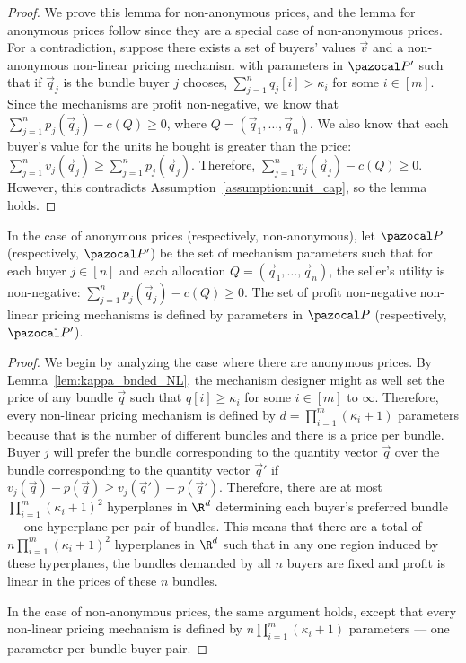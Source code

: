 \begin{proof}
We prove this lemma for non-anonymous prices, and the lemma for anonymous prices follow since they are a special case of non-anonymous prices. For a contradiction, suppose there exists a set of buyers' values $\vec{v}$ and a non-anonymous non-linear pricing mechanism with parameters in $\pspace'$ such that if $\vec{q}_j$ is the bundle buyer $j$ chooses, $\sum_{j = 1}^n q_j[i] > \kappa_i$ for some $i \in [m]$. Since the mechanisms are profit non-negative, we know that $\sum_{j = 1}^n p_j(\vec{q}_j)- c\left(Q\right) \geq 0$, where $Q = \left(\vec{q}_1, \dots, \vec{q}_n\right)$. We also know that each buyer's value for the units he bought is greater than the price: $\sum_{j = 1}^n v_j(\vec{q}_j) \geq \sum_{j = 1}^n p_j(\vec{q}_j)$. Therefore, $\sum_{j = 1}^n v_j(\vec{q}_j) - c(Q) \geq 0$. However, this contradicts Assumption~\ref{assumption:unit_cap}, so the lemma holds.
\end{proof}

\begin{definition}\label{def:PNN_NL}
	In the case of anonymous prices (respectively, non-anonymous), let $\pspace$ (respectively, $\pspace'$) be the set of mechanism parameters such that for each buyer $j \in [n]$ and each allocation $Q = \left(\vec{q}_1, \dots, \vec{q}_n\right)$, the seller's utility is non-negative: $\sum_{j = 1}^n p_j(\vec{q}_j) - c\left(Q\right) \geq 0.$ The set of profit non-negative non-linear pricing mechanisms is defined by parameters in $\pspace$ (respectively, $\pspace'$).
\end{definition}

\nonlinear*

\begin{proof}
We begin by analyzing the case where there are anonymous prices. By Lemma~\ref{lem:kappa_bnded_NL}, the mechanism designer might as well set the price of any bundle $\vec{q}$ such that $q[i] \geq \kappa_i$ for some $i \in [m]$ to $\infty$. Therefore, every non-linear pricing mechanism is defined by $d = \prod_{i = 1}^m \left(\kappa_i+1\right)$ parameters because that is the number of different bundles and there is a price per bundle. Buyer $j$ will prefer the bundle corresponding to the quantity vector $\vec{q}$ over the bundle corresponding to the quantity vector $\vec{q}'$ if $v_j(\vec{q}) - p(\vec{q}) \geq v_j(\vec{q}') - p(\vec{q}')$. Therefore, there are at most $\prod_{i = 1}^m \left(\kappa_i+1\right)^2$ hyperplanes in $\R^{d}$ determining each buyer's preferred bundle --- one hyperplane per pair of bundles. This means that there are a total of $n\prod_{i = 1}^m \left(\kappa_i+1\right)^2$ hyperplanes in $\R^{d}$ such that in any one region induced by these hyperplanes, the bundles demanded by all $n$ buyers are fixed and profit is linear in the prices of these $n$ bundles.

In the case of non-anonymous prices, the same argument holds, except that every non-linear pricing mechanism is defined by $n\prod_{i = 1}^m \left(\kappa_i+1\right)$ parameters --- one parameter per bundle-buyer pair.
\end{proof}

